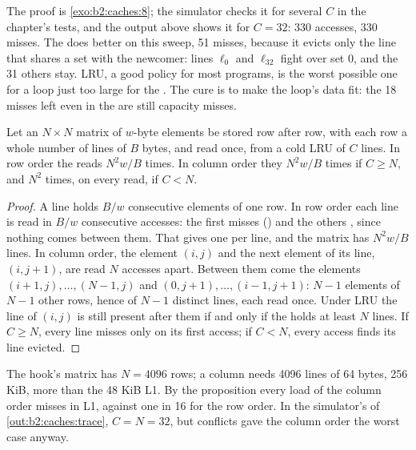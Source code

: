 The proof is \cref{exo:b2:caches:8}; the simulator checks it for several $C$ in the chapter's tests, and the output
above shows it for $C = 32$: 330 accesses, 330 misses. The  does better on this sweep, 51 misses,
because it evicts only the line that shares a set with the newcomer: lines $\ell_0$ and $\ell_{32}$ fight over set 0,
and the 31 others stay. LRU, a good policy for most programs, is the worst possible one for a loop just too large for the
. The cure is to make the loop's data fit: the 18 misses left even in the  are still
capacity misses.

\begin{proposition}\label{prop:b2:caches:traversal}
Let an $N \times N$ matrix of $w$-byte elements be stored row after row, with each row a whole number of lines of
$B$ bytes, and read once, from a cold  LRU  of $C$ lines. In row order the reads 
$N^2 w / B$ times. In column order they  $N^2 w / B$ times if $C \ge N$, and $N^2$ times, on every read, if
$C < N$.
\end{proposition}

\begin{proof}
A line holds $B/w$ consecutive elements of one row. In row order each line is read in $B/w$ consecutive accesses: the
first misses () and the others , since nothing comes between them. That gives one  per line, and
the matrix has $N^2 w / B$ lines.
In column order, the element $(i, j)$ and the next element of its line, $(i, j + 1)$, are read $N$ accesses apart.
Between them come the elements $(i + 1, j), \dots, (N - 1, j)$ and $(0, j + 1), \dots, (i - 1, j + 1)$: $N - 1$
elements of $N - 1$ other rows, hence of $N - 1$ distinct lines, each read once. Under LRU the line of $(i, j)$ is
still present after them if and only if the  holds at least $N$ lines. If $C \ge N$, every line misses only on
its first access; if $C < N$, every access finds its line evicted.
\end{proof}

The hook's matrix has $N = 4096$ rows; a column needs 4096 lines of 64 bytes, 256 KiB, more than the 48 KiB L1. By
the proposition every load of the column order misses in L1, against one in 16 for the row order. In the simulator's
 of \cref{out:b2:caches:trace}, $C = N = 32$, but conflicts gave the column order the worst case
anyway.


